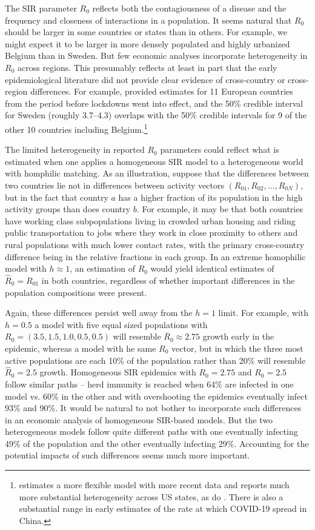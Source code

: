 \documentclass[11pt]{article}
\begin{document}
The SIR parameter $R_0$ reflects both the contagiousness of a disease and the frequency and closeness of interactions 
in a population. It seems natural that $R_0$ should be larger in some countries or states than in others. For example, we might
expect it to be larger in more densely populated and highly urbanized Belgium than in Sweden. But few economic analyses 
incorporate heterogeneity in $R_0$ across regions. This presumably reflects at least in part that the early epidemiological literature did not provide clear evidence of cross-country or cross-region differences. For example, \citet{flaxman2020report} provided
estimates for 11 European countries from the period before lockdowns went into effect, and the 50\% credible interval for 
Sweden (roughly 3.7--4.3) overlaps with the 50\% credible intervals for 9 of the other 10 countries including 
Belgium.\footnote{\citet{unwin2020state} estimates a more flexible model with more recent data and reports much more substantial heterogeneity across US states, as do \citet{fernandez2020estimating}. There is also a
substantial range in early estimates of the rate at which
COVID-19 spread in China.}

The limited heterogeneity in reported $R_0$ parameters could reflect what is estimated when one applies a homogeneous
SIR model to a heterogeneous world with homphilic matching. As an illustration, suppose that the differences between two countries lie not in 
differences between activity vectors $(R_{01}, R_{02}, \ldots, R_{0N})$, but in the fact that country $a$ has a higher
fraction of its population in the high activity groups than does country $b$. For example, it may be that both countries
have working class subpopulations living in crowded urban housing and riding public transportation to jobs where they work in close proximity to others and rural populations with much lower contact rates, with the primary cross-country difference being in the relative fractions in each group. 
In an extreme homophilic model with
$h \approx 1$, an estimation of $R_0$ would yield identical estimates of $\hat{R}_0 = R_{01}$ in both countries, regardless of whether important differences in the population compositions were present. 

Again, these differences persist well away from the $h=1$ limit.
For example, with $h=0.5$ a model with five equal sized 
populations with $R_0 = (3.5, 1.5, 1.0, 0.5, 0.5)$ will
resemble $\overline{R}_0 \approx 2.75$ growth early in 
the epidemic, whereas a model with he same $R_0$ vector, 
but in which 
the three most active populations are each 10\% of the population rather than 20\% will resemble $\hat{R}_0 = 2.5$ growth. Homogeneous SIR epidemics with $R_0 = 2.75$ and $R_0=2.5$ follow similar paths -- herd immunity is reached when 64\% are infected in one model vs. 60\% in the other and with overshooting the epidemics 
eventually infect 93\% and 90\%. It would be natural to not bother to incorporate such differences in an
economic analysis of homogeneous SIR-based models. But the two heterogeneous models follow quite different paths with one eventually infecting 49\% of the population and the other eventually infecting 29\%. Accounting for the potential impacts of such differences seems much more important.
\end{document}
